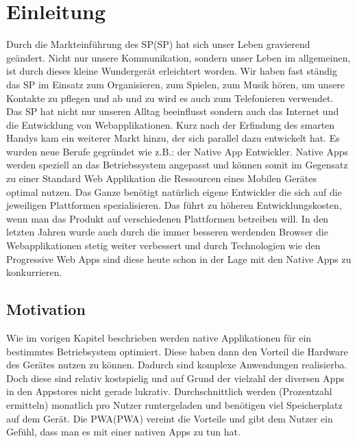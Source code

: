 \chapter{Einleitung}\label{chap:Einleitung}
\thispagestyle{standard}
\pagestyle{standard}
\renewcommand{\footrulewidth}{0.4pt}

Durch die Markteinführung des \acl{SP}(\acs{SP}) hat sich unser Leben gravierend geändert. 
Nicht nur unsere Kommunikation, sondern unser Leben im allgemeinen, ist durch dieses kleine Wundergerät erleichtert worden.
Wir haben fast ständig das \acs{SP} im Einsatz zum Organisieren, zum Spielen, zum Musik hören, um unsere Kontakte zu pflegen und ab und zu wird es auch zum Telefonieren verwendet.
Das \acs{SP} hat nicht nur unseren Alltag beeinflusst sondern auch das Internet und die Entwicklung von Webapplikationen. Kurz nach der Erfindung des smarten Handys kam ein weiterer Markt 
hinzu, der sich parallel dazu entwickelt hat. Es wurden neue Berufe gegründet wie z.B.: der Native App Entwickler.
Native Apps werden speziell an das Betriebssystem angepasst und können somit im Gegensatz zu einer Standard Web Applikation die Ressourcen eines Mobilen Gerätes optimal nutzen. 
Das Ganze benötigt natürlich eigene Entwickler die sich auf die jeweiligen Plattformen spezialisieren.
Das führt zu höheren Entwicklungskosten, wenn man das Produkt auf verschiedenen Plattformen betreiben will.
In den letzten Jahren wurde auch durch die immer besseren werdenden Browser die Webapplikationen stetig weiter verbessert und durch 
Technologien wie den Progressive Web Apps sind diese heute schon in der Lage mit den Native Apps zu konkurrieren. 




\section{Motivation} \label{sub:Motivation}
Wie im vorigen Kapitel beschrieben werden native Applikationen für ein bestimmtes Betriebsystem optimiert. Diese haben dann den Vorteil die Hardware des Gerätes nutzen zu können. 
Dadurch sind komplexe Anwendungen realisierba. Doch diese sind relativ kostspielig und auf Grund der vielzahl der diversen Apps in den Appstores nicht gerade lukrativ.
Durchschnittlich werden (Prozentzahl ermitteln) monatlich pro Nutzer runtergeladen und benötigen viel Speicherplatz auf dem Gerät.
Die \acl{PWA}(\acs{PWA}) vereint die Vorteile und gibt dem Nutzer ein Gefühl, dass man es mit einer nativen Apps zu tun hat.




